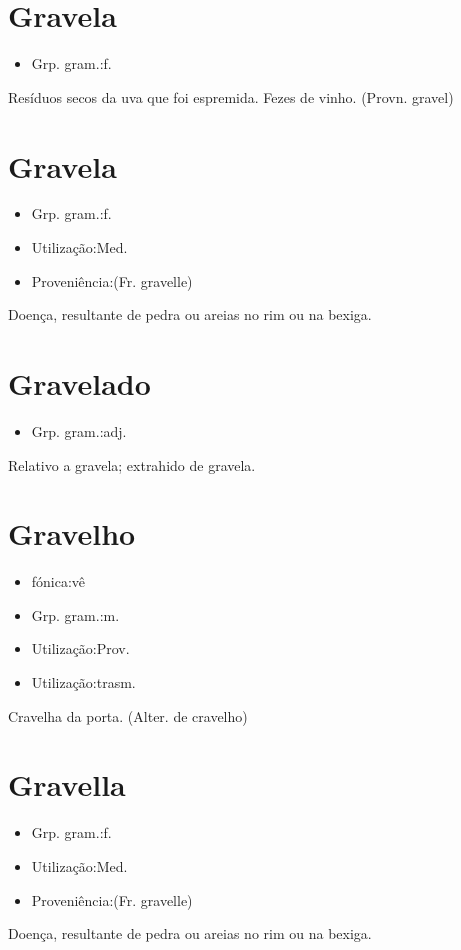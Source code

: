 \section{Gravela}
\begin{itemize}
\item {Grp. gram.:f.}
\end{itemize}
Resíduos secos da uva que foi espremida.
Fezes de vinho.
(Provn. \textunderscore gravel\textunderscore )
\section{Gravela}
\begin{itemize}
\item {Grp. gram.:f.}
\end{itemize}
\begin{itemize}
\item {Utilização:Med.}
\end{itemize}
\begin{itemize}
\item {Proveniência:(Fr. \textunderscore gravelle\textunderscore )}
\end{itemize}
Doença, resultante de pedra ou areias no rim ou na bexiga.
\section{Gravelado}
\begin{itemize}
\item {Grp. gram.:adj.}
\end{itemize}
Relativo a gravela; extrahido de gravela.
\section{Gravelho}
\begin{itemize}
\item {fónica:vê}
\end{itemize}
\begin{itemize}
\item {Grp. gram.:m.}
\end{itemize}
\begin{itemize}
\item {Utilização:Prov.}
\end{itemize}
\begin{itemize}
\item {Utilização:trasm.}
\end{itemize}
Cravelha da porta.
(Alter. de \textunderscore cravelho\textunderscore )
\section{Gravella}
\begin{itemize}
\item {Grp. gram.:f.}
\end{itemize}
\begin{itemize}
\item {Utilização:Med.}
\end{itemize}
\begin{itemize}
\item {Proveniência:(Fr. \textunderscore gravelle\textunderscore )}
\end{itemize}
Doença, resultante de pedra ou areias no rim ou na bexiga.
